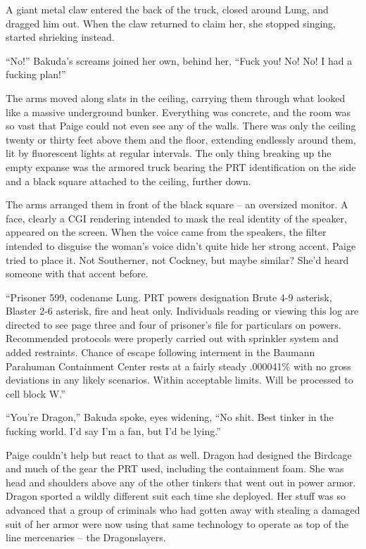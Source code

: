 A giant metal claw entered the back of the truck, closed around Lung, and dragged him out.  When the claw returned to claim her, she stopped singing, started shrieking instead.



``No!'' Bakuda's screams joined her own, behind her, ``Fuck you!  No!  No!  I had a fucking plan!''



The arms moved along slats in the ceiling, carrying them through what looked like a massive underground bunker.  Everything was concrete, and the room was so vast that Paige could not even see any of the walls.  There was only the ceiling twenty or thirty feet above them and the floor, extending endlessly around them, lit by fluorescent lights at regular intervals.  The only thing breaking up the empty expanse was the armored truck bearing the PRT identification on the side and a black square attached to the ceiling, further down.



The arms arranged them in front of the black square – an oversized monitor.  A face, clearly a CGI rendering intended to mask the real identity of the speaker, appeared on the screen.  When the voice came from the speakers, the filter intended to disguise the woman's voice didn't quite hide her strong accent.  Paige tried to place it.  Not Southerner, not Cockney, but maybe similar?  She'd heard someone with that accent before.



``Prisoner 599, codename Lung.  PRT powers designation Brute 4-9 asterisk, Blaster 2-6 asterisk, fire and heat only.  Individuals reading or viewing this log are directed to see page three and four of prisoner's file for particulars on powers.  Recommended protocols were properly carried out with sprinkler system and added restraints.  Chance of escape following interment in the Baumann Parahuman Containment Center rests at a fairly steady .000041\% with no gross deviations in any likely scenarios.  Within acceptable limits.  Will be processed to cell block W.''



``You're Dragon,'' Bakuda spoke, eyes widening, ``No shit.  Best tinker in the fucking world.  I'd say I'm a fan, but I'd be lying.''



Paige couldn't help but react to that as well.  Dragon had designed the Birdcage and much of the gear the PRT used, including the containment foam.  She was head and shoulders above any of the other tinkers that went out in power armor.  Dragon sported a wildly different suit each time she deployed.  Her stuff was so advanced that a group of criminals who had gotten away with stealing a damaged suit of her armor were now using that same technology to operate as top of the line mercenaries – the Dragonslayers.



